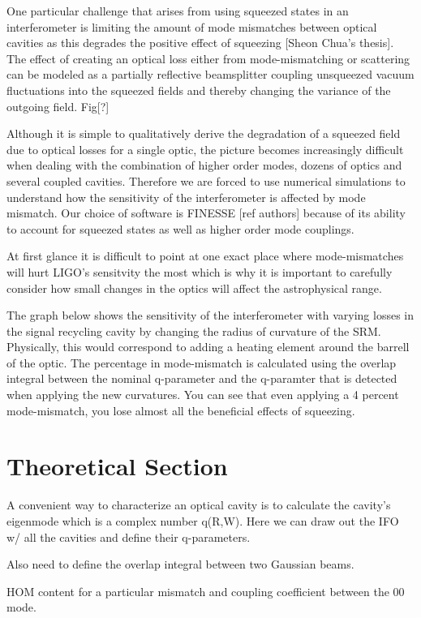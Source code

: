 \documentclass[12pt]{iopart}
\begin{document}
One particular challenge that arises from using squeezed states in an interferometer is limiting the amount of mode mismatches between optical cavities as this degrades the positive effect of squeezing [Sheon Chua's thesis].  The effect of creating an optical loss either from mode-mismatching or scattering can be modeled as a partially reflective beamsplitter coupling unsqueezed vacuum fluctuations into the squeezed fields and thereby changing the variance of the outgoing field. Fig[?]

Although it is simple to qualitatively derive the degradation of a squeezed field due to optical losses for a single optic, the picture becomes increasingly difficult when dealing with the combination of higher order modes, dozens of optics and several coupled cavities.  Therefore we are forced to use numerical simulations to understand how the sensitivity of the interferometer is affected by mode mismatch. Our choice of software is FINESSE [ref authors] because of its ability to account for squeezed states as well as higher order mode couplings.  

At first glance it is difficult to point at one exact place where mode-mismatches will hurt LIGO's sensitvity the most which is why it is important to carefully consider how small changes in the optics will affect the astrophysical range.  

The graph below shows the sensitivity of the interferometer with varying losses in the signal recycling cavity by changing the radius of curvature of the SRM.  Physically, this would correspond to adding a heating element around the barrell of the optic.  The percentage in mode-mismatch is calculated using the overlap integral between the nominal q-parameter and the q-paramter that is detected when applying the new curvatures.  You can see that even applying a 4 percent mode-mismatch, you lose almost all the beneficial effects of squeezing.

\section{Theoretical Section}

A convenient way to characterize an optical cavity is to calculate the cavity's eigenmode which is a complex number q(R,W).  Here we can draw out the IFO w/ all the cavities and define their q-parameters.

Also need to define the overlap integral between two Gaussian beams.

HOM content for a particular mismatch and coupling coefficient between the 00 mode.
\end{document}
